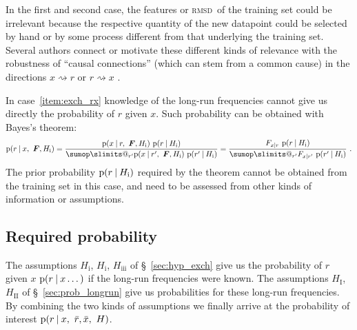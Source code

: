 \documentclass[\ifafour a4paper,12pt,\else a5paper,10pt,\fi%
onecolumn,oneside,article,%
british%
]{memoir}
\makeatletter
\theoremstyle{remark}
\theoremstyle{innote}
\def\sum{\DOTSI\sumop\slimits@}
\newcommand*{\p}{\mathrm{p}}%
\renewcommand*{\|}[1][]{\nonscript\:#1\vert\nonscript\:\mathopen{}}
\renewcommand*{\=}{\TextOrMath\texteq\eq}
\newcommand*{\sect}{\S}%
\newcommand*{\sects}{\S\S}%
\newcommand*{\cf}{{cf.}}
\newcommand*{\wrench}{{\fontencoding{U}\fontfamily{fontawesomethree}\selectfont\symbol{114}}}
\newcommand{\mynote}[1]{ {\color{notecolour}#1}}
\newcommand*{\rmsd}{\textsc{rmsd}}
\newcommand*{\ro}{r}
\newcommand*{\xo}{x}
\newcommand*{\rd}{\bar{r}}
\newcommand*{\xd}{\bar{x}}
\newcommand*{\yF}{\bm{F}}
\makeatother
\begin{document}
In the first and second case, the features or \rmsd\ of the training set
could be irrelevant because the respective quantity of the new datapoint
could be selected by hand or by some process different from that underlying
the training set. Several authors connect or motivate these different kinds
of relevance with the robustness of \enquote{causal connections} (which can
stem from a common cause) in the directions $\xo \rightsquigarrow \ro$ or
$\ro \rightsquigarrow \xo$ \parencites[\cf][\sects~2.1.2,
2.2.5]{pearl1988}.

In case~\ref{item:exch_rx} knowledge of the long-run frequencies cannot
give us directly the probability of $\ro$ given $\xo$. Such probability can
be obtained with Bayes's theorem:
\begin{equation}
  \label{eq:p_xr_bayes}
  \p(\ro \| \xo,\ \yF, H_{\textrm{i}}) =
  \frac{
    \p(\xo \| \ro,\ \yF, H_{\textrm{i}}) \ \p(\ro\| H_{\textrm{i}})
  }{
\sum_{\ro'} \p(\xo \| \ro',\ \yF, H_{\textrm{i}}) \ \p(\ro'\| H_{\textrm{i}})
} =
  \frac{ F_{\xo\mid\ro} \ \p(\ro\|  H_{\textrm{i}})
  }{ \sum_{\ro'} F_{\xo\mid\ro'} \ \p(\ro'\| H_{\textrm{i}})} \ .
\end{equation}
The prior probability $\p(\ro\| H_{\textrm{i}})$ required by the theorem
cannot be obtained from the training set in this case, and need to be
assessed from other kinds of information or assumptions.


\subsection{Required probability}
\label{sec:p_final_inference}

The assumptions $H_{\textrm{i}}$, $H_{\textrm{i}}$, $H_{\textrm{iii}}$ of
\sect~\ref{sec:hyp_exch} give us the probability of $\ro$ given $\xo$
$\p(\ro \| \xo \dotsc)$ if the long-run frequencies were known. The
assumptions $H_{\textrm{I}}$, $H_{\textrm{II}}$ of
\sect~\ref{sec:prob_longrun} give us probabilities for these long-run
frequencies. By combining the two kinds of assumptions we finally arrive at
the probability of interest $\p(\ro \| \xo,\ \rd,\xd,\ H)$.
\end{document}
